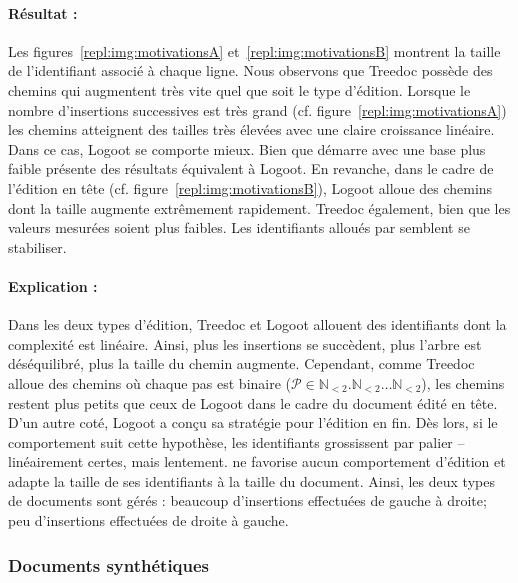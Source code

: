 \paragraph{Résultat :} Les figures~\ref{repl:img:motivationsA}
et~\ref{repl:img:motivationsB} montrent la taille de l'identifiant associé à
chaque ligne. Nous observons que Treedoc possède des chemins qui augmentent très
vite quel que soit le type d'édition. Lorsque le nombre d'insertions successives
est très grand (cf. figure~\ref{repl:img:motivationsA}) les chemins atteignent
des tailles très élevées avec une claire croissance linéaire. Dans ce cas,
Logoot se comporte mieux. Bien que \LSEQ démarre avec une base plus faible
présente des résultats équivalent à Logoot. En revanche, dans le cadre de
l'édition en tête (cf. figure~\ref{repl:img:motivationsB}), Logoot alloue des
chemins dont la taille augmente extrêmement rapidement. Treedoc également, bien
que les valeurs mesurées soient plus faibles. Les identifiants alloués par
\LSEQ semblent se stabiliser.


\paragraph{Explication :} Dans les deux types d'édition, Treedoc et Logoot
allouent des identifiants dont la complexité est linéaire. Ainsi, plus les
insertions se succèdent, plus l'arbre est déséquilibré, plus la taille du chemin
augmente. Cependant, comme Treedoc alloue des chemins où chaque pas est binaire
($\mathcal{P}\in \mathbb{N}_{<2}.\mathbb{N}_{<2}\ldots\mathbb{N}_{<2}$), les
chemins restent plus petits que ceux de Logoot dans le cadre du document édité
en tête. D'un autre coté, Logoot a conçu sa stratégie pour l'édition en fin. Dès
lors, si le comportement suit cette hypothèse, les identifiants grossissent par
palier -- linéairement certes, mais lentement. \LSEQ ne favorise aucun
comportement d'édition et adapte la taille de ses identifiants à la taille du
document. Ainsi, les deux types de documents sont gérés : beaucoup d'insertions
effectuées de gauche à droite; peu d'insertions effectuées de droite à gauche.


\subsubsection{Documents synthétiques}

